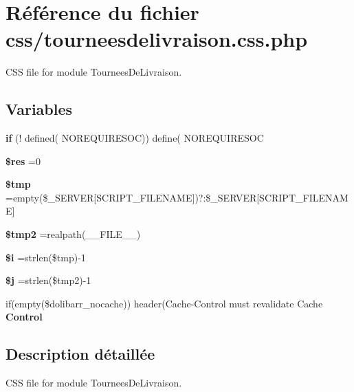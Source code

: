 \hypertarget{tourneesdelivraison_8css_8php}{}\section{Référence du fichier css/tourneesdelivraison.css.\+php}
\label{tourneesdelivraison_8css_8php}


C\+SS file for module Tournees\+De\+Livraison.  


\subsection*{Variables}
\begin{DoxyCompactItemize}
\item 
\mbox{\label{tourneesdelivraison_8css_8php_affa79d44f1ca71088c54730f8c7e7641}} 
{\bfseries if} (! defined( \textquotesingle{}N\+O\+R\+E\+Q\+U\+I\+R\+E\+S\+OC\textquotesingle{})) define( \textquotesingle{}N\+O\+R\+E\+Q\+U\+I\+R\+E\+S\+OC\textquotesingle{}
\item 
\mbox{\label{tourneesdelivraison_8css_8php_a49a8a4009b02e49717caa88b128affc5}} 
{\bfseries \$res} =0
\item 
\mbox{\label{tourneesdelivraison_8css_8php_a57024d47cf8348153f5fdda16f8fefa9}} 
{\bfseries \$tmp} =empty(\$\+\_\+\+S\+E\+R\+V\+ER\mbox{[}\textquotesingle{}S\+C\+R\+I\+P\+T\+\_\+\+F\+I\+L\+E\+N\+A\+ME\textquotesingle{}\mbox{]})?\textquotesingle{}\textquotesingle{}\+:\$\+\_\+\+S\+E\+R\+V\+ER\mbox{[}\textquotesingle{}S\+C\+R\+I\+P\+T\+\_\+\+F\+I\+L\+E\+N\+A\+ME\textquotesingle{}\mbox{]}
\item 
\mbox{\label{tourneesdelivraison_8css_8php_aed9bcb6730d1510376ce80e32bd9504d}} 
{\bfseries \$tmp2} =realpath(\+\_\+\+\_\+\+F\+I\+L\+E\+\_\+\+\_\+)
\item 
\mbox{\label{tourneesdelivraison_8css_8php_a83018d9153d17d91fbcf3bc10158d34f}} 
{\bfseries \$i} =strlen(\$tmp)-\/1
\item 
\mbox{\label{tourneesdelivraison_8css_8php_a6f16db779ef3ccea921b277b5dc245d1}} 
{\bfseries \$j} =strlen(\$tmp2)-\/1
\item 
\mbox{\label{tourneesdelivraison_8css_8php_a675d13e499e57786d6294c2c6926fc21}} 
if(empty(\$dolibarr\+\_\+nocache)) header(\textquotesingle{}Cache-\/Control must revalidate Cache {\bfseries Control}
\end{DoxyCompactItemize}


\subsection{Description détaillée}
C\+SS file for module Tournees\+De\+Livraison. 

